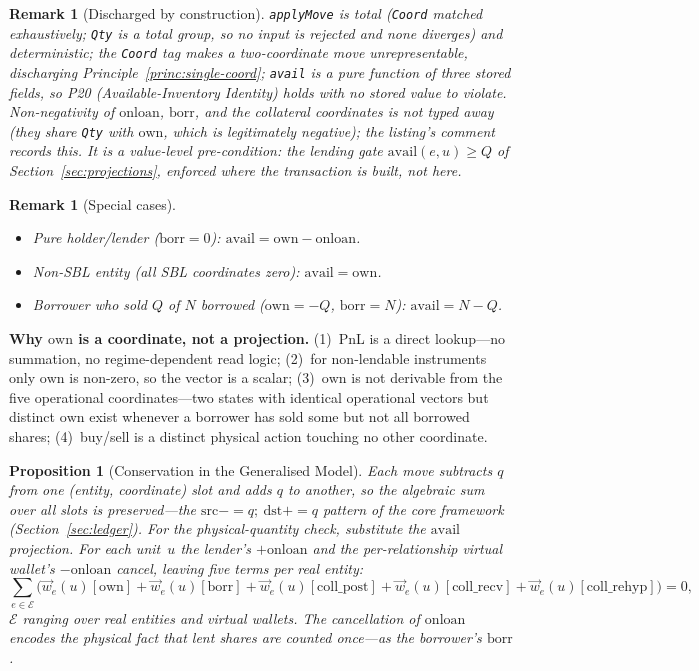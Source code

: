 \documentclass[11pt,a4paper]{article}
\newtheorem{proposition}[definition]{Proposition}
\newtheorem{remark}[definition]{Remark}
\begin{document}
\begin{remark}[Discharged by construction]
\verb|applyMove| is total (\verb|Coord| matched exhaustively; \verb|Qty| is a total group, so no input is rejected and none diverges) and deterministic; the \verb|Coord| tag makes a two-coordinate move \emph{unrepresentable}, discharging Principle~\ref{princ:single-coord}; \verb|avail| is a pure function of three stored fields, so P20 (Available-Inventory Identity) holds with no stored value to violate. Non-negativity of $\mathrm{onloan}$, $\mathrm{borr}$, and the collateral coordinates is \emph{not} typed away (they share \verb|Qty| with $\mathrm{own}$, which is legitimately negative); the listing's comment records this. It is a value-level pre-condition: the lending gate $\mathrm{avail}(e,u)\geq Q$ of Section~\ref{sec:projections}, enforced where the transaction is built, not here.
\end{remark}

\begin{remark}[Special cases]
\hfill
\begin{itemize}[nosep]
\item Pure holder/lender ($\mathrm{borr}=0$): $\mathrm{avail} = \mathrm{own} - \mathrm{onloan}$.
\item Non-SBL entity (all SBL coordinates zero): $\mathrm{avail} = \mathrm{own}$.
\item Borrower who sold $Q$ of $N$ borrowed ($\mathrm{own}=-Q$, $\mathrm{borr}=N$): $\mathrm{avail} = N - Q$.
\end{itemize}
\end{remark}

\noindent\textbf{Why $\mathrm{own}$ is a coordinate, not a projection.} (1)~PnL is a direct lookup---no summation, no regime-dependent read logic; (2)~for non-lendable instruments only $\mathrm{own}$ is non-zero, so the vector is a scalar; (3)~$\mathrm{own}$ is not derivable from the five operational coordinates---two states with identical operational vectors but distinct $\mathrm{own}$ exist whenever a borrower has sold some but not all borrowed shares; (4)~buy/sell is a distinct physical action touching no other coordinate.

\begin{proposition}[Conservation in the Generalised Model]
\label{prop:gpm-conservation}
Each move subtracts $q$ from one (entity, coordinate) slot and adds $q$ to another, so the algebraic sum over all slots is preserved---the $\mathrm{src}\mathbin{{-}{=}}q;\ \mathrm{dst}\mathbin{{+}{=}}q$ pattern of the core framework (Section~\ref{sec:ledger}). For the physical-quantity check, substitute the $\mathrm{avail}$ projection. For each unit~$u$ the lender's $+\mathrm{onloan}$ and the per-relationship virtual wallet's $-\mathrm{onloan}$ cancel, leaving five terms per real entity:
\[
\sum_{e \in \mathcal{E}} \bigl( \vec{w}_e(u)[\mathrm{own}] + \vec{w}_e(u)[\mathrm{borr}] + \vec{w}_e(u)[\mathrm{coll\_post}] + \vec{w}_e(u)[\mathrm{coll\_recv}] + \vec{w}_e(u)[\mathrm{coll\_rehyp}] \bigr) = 0,
\]
$\mathcal{E}$ ranging over real entities and virtual wallets. The cancellation of $\mathrm{onloan}$ encodes the physical fact that lent shares are counted once---as the borrower's $\mathrm{borr}$.
\end{proposition}
\end{document}
